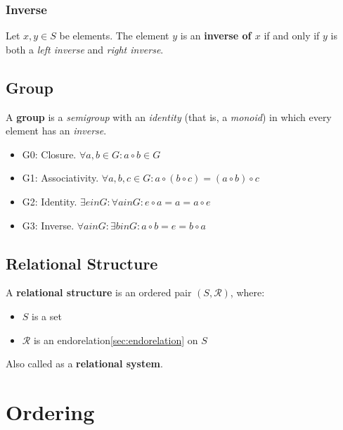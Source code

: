 \subsubsection{Inverse}
Let $x , y \in S $ be elements. The element $y$ is an \textbf{inverse
  of $x$} if and only if $y$ is both a \textit{left inverse} and
\textit{right inverse}.


\subsection{Group}
\label{sec:group}

A \textbf{group} is a \textit{semigroup} with an \textit{identity}
(that is, a \textit{monoid}) in which every element has an
\textit{inverse}.

\begin{itemize}
\item G0: Closure. $ \forall a, b \in G: a \circ b \in G$
\item G1: Associativity. $ \forall a, b, c \in G: a \circ (b \circ c) = (a \circ b) \circ c $
\item G2: Identity. $\exists e in G : \forall a in G: e \circ a = a = a \circ e $
\item G3: Inverse. $\forall a in G: \exists b in G: a \circ b = e = b \circ a$
\end{itemize}


\subsection{Relational Structure}
\label{sec:relational-structure}

A \textbf{relational structure} is an ordered pair $(S, \mathcal{R})$,
where:

\begin{itemize}
\item $S$ is a set
\item $\mathcal{R}$ is an endorelation\ref{sec:endorelation} on $S$
\end{itemize}

Also called as a \textbf{relational system}.




\section{Ordering}
\label{sec:ordering}

